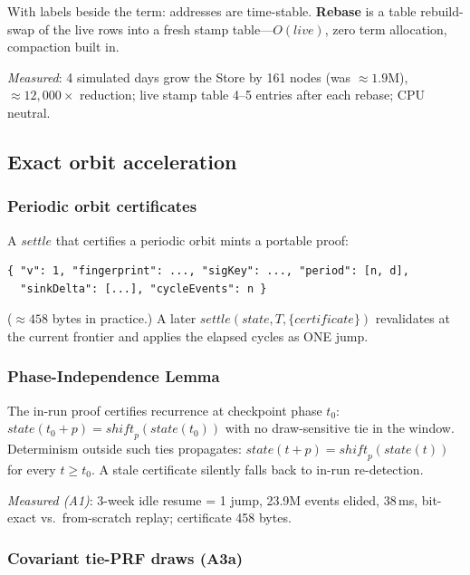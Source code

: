 \documentclass[11pt]{article}
\newcommand{\settle}{\mathit{settle}}
\theoremstyle{definition}
\theoremstyle{remark}
\begin{document}
With labels beside the term: addresses are time-stable.  \textbf{Rebase} is a
table rebuild-swap of the live rows into a fresh stamp table---$O(\mathit{live})$,
zero term allocation, compaction built in.

\textit{Measured}: 4 simulated days grow the Store by 161 nodes (was $\approx
1.9$M), $\approx 12{,}000\times$ reduction; live stamp table 4--5 entries after
each rebase; CPU neutral.

\subsection{Exact orbit acceleration}
\label{subsec:acceleration}

\subsubsection*{Periodic orbit certificates}

A $\settle$ that certifies a periodic orbit mints a portable proof:

\begin{lstlisting}[language={}]
{ "v": 1, "fingerprint": ..., "sigKey": ..., "period": [n, d],
  "sinkDelta": [...], "cycleEvents": n }
\end{lstlisting}

($\approx 458$ bytes in practice.)  A later $\settle(\mathit{state}, T,
\{\mathit{certificate}\})$ revalidates at the current frontier and applies the
elapsed cycles as ONE jump.

\subsubsection*{Phase-Independence Lemma}

The in-run proof certifies recurrence at checkpoint phase $t_0$:
$\mathit{state}(t_0 + p) = \mathit{shift}_p(\mathit{state}(t_0))$ with no
draw-sensitive tie in the window.  Determinism outside such ties propagates:
$\mathit{state}(t + p) = \mathit{shift}_p(\mathit{state}(t))$ for every $t \geq
t_0$.  A stale certificate silently falls back to in-run re-detection.

\textit{Measured (A1)}: 3-week idle resume = 1 jump, 23.9M events elided, 38\,ms,
bit-exact vs.\ from-scratch replay; certificate 458 bytes.

\subsubsection*{Covariant tie-PRF draws (A3a)}
\end{document}
